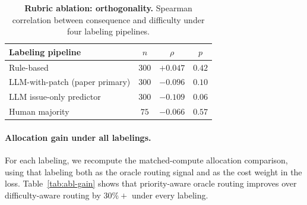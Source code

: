 \documentclass{article}
\begin{document}
\begin{table}[h]
\centering
\caption{\textbf{Rubric ablation: orthogonality.} Spearman correlation
between consequence and difficulty under four labeling pipelines.}
\label{tab:abl-ortho}
\small
\begin{tabular}{lccc}
\toprule
Labeling pipeline & $n$ & $\rho$ & $p$ \\
\midrule
Rule-based & $300$ & $+0.047$ & $0.42$ \\
LLM-with-patch (paper primary) & $300$ & $-0.096$ & $0.10$ \\
LLM issue-only predictor & $300$ & $-0.109$ & $0.06$ \\
Human majority & $75$ & $-0.066$ & $0.57$ \\
\bottomrule
\end{tabular}
\end{table}

\paragraph{Allocation gain under all labelings.}
For each labeling, we recompute the matched-compute allocation
comparison, using that labeling both as the oracle routing signal and
as the cost weight in the loss. Table~\ref{tab:abl-gain} shows that
priority-aware oracle routing improves over difficulty-aware routing
by $30\%+$ under every labeling.

\begin{table}[h]
\centering
\caption{\textbf{Rubric ablation: allocation gain.} Cost-weighted loss
at the matched top-$25\%$ premium budget, recomputed under each
labeling pipeline.}
\label{tab:abl-gain}
\small
{}
\end{table}
\end{document}
